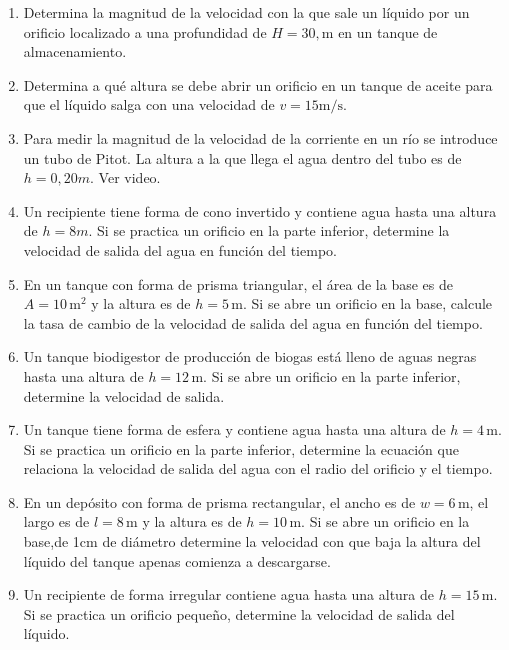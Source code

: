 \documentclass[../main]{subfiles}
\begin{document}
\begin{enumerate}
  \item Determina la magnitud de la velocidad con la que sale un
    líquido por un orificio localizado a una profundidad de $H = 30 ,
    \text{m}$ en un tanque de almacenamiento.

  \item Determina a qué altura se debe abrir un orificio en un tanque
    de aceite para que el líquido salga con una velocidad de $v = 15
    \text{m/s}$.

  \item Para medir la magnitud de la velocidad de la corriente en un
    río se introduce un tubo de Pitot. La altura a la que llega el
    agua dentro del tubo es de $h=0,20m$. Ver video.


  \item Un recipiente tiene forma de cono invertido y contiene agua
    hasta una altura de $h=8m$. Si se practica un orificio en la
    parte inferior, determine la velocidad de salida del agua en
    función del tiempo.

  \item En un tanque con forma de prisma triangular, el área de la
    base es de $A = 10 \, \text{m}^2$ y la altura es de $h = 5 \,
    \text{m}$. Si se abre un orificio en la base, calcule la tasa de
    cambio de la velocidad de salida del agua en función del tiempo.

  \item Un tanque biodigestor de producción de biogas está lleno de
    aguas negras hasta una altura de $h = 12 \, \text{m}$. Si se abre
    un orificio en la parte inferior, determine  la velocidad de salida.


  \item Un tanque tiene forma de esfera y contiene agua hasta una
    altura de $h = 4 \, \text{m}$. Si se practica un orificio en la
    parte inferior, determine la ecuación que relaciona la velocidad
    de salida del agua con el radio del orificio y el tiempo.

  \item En un depósito con forma de prisma rectangular, el ancho es
    de $w = 6 \, \text{m}$, el largo es de $l = 8 \, \text{m}$ y la
    altura es de $h = 10 \, \text{m}$. Si se abre un orificio en la
    base,de 1cm de diámetro determine la velocidad con que baja la
    altura del líquido del tanque apenas comienza a descargarse.

  \item Un recipiente de forma irregular contiene agua hasta una
    altura de $h = 15 \, \text{m}$. Si se practica un orificio
    pequeño, determine la velocidad de salida del líquido.
\end{enumerate}
\end{document}
